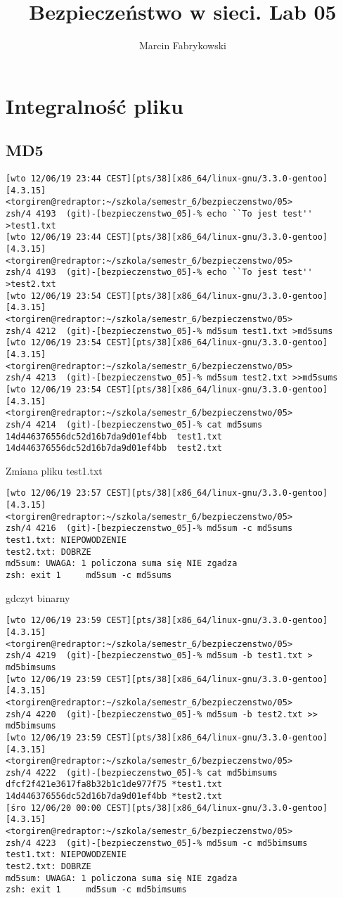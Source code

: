 \documentclass[a4paper,12pt]{article}
\author{Marcin Fabrykowski}
\title{Bezpieczeństwo w sieci. Lab 05}
\begin{document}
\maketitle
\newpage
\section{Integralność pliku}
\subsection{MD5}
\small
\begin{verbatim}
[wto 12/06/19 23:44 CEST][pts/38][x86_64/linux-gnu/3.3.0-gentoo][4.3.15]
<torgiren@redraptor:~/szkola/semestr_6/bezpieczenstwo/05>
zsh/4 4193  (git)-[bezpieczenstwo_05]-% echo ``To jest test'' >test1.txt
[wto 12/06/19 23:44 CEST][pts/38][x86_64/linux-gnu/3.3.0-gentoo][4.3.15]
<torgiren@redraptor:~/szkola/semestr_6/bezpieczenstwo/05>
zsh/4 4193  (git)-[bezpieczenstwo_05]-% echo ``To jest test'' >test2.txt
[wto 12/06/19 23:54 CEST][pts/38][x86_64/linux-gnu/3.3.0-gentoo][4.3.15]
<torgiren@redraptor:~/szkola/semestr_6/bezpieczenstwo/05>
zsh/4 4212  (git)-[bezpieczenstwo_05]-% md5sum test1.txt >md5sums         
[wto 12/06/19 23:54 CEST][pts/38][x86_64/linux-gnu/3.3.0-gentoo][4.3.15]
<torgiren@redraptor:~/szkola/semestr_6/bezpieczenstwo/05>
zsh/4 4213  (git)-[bezpieczenstwo_05]-% md5sum test2.txt >>md5sums
[wto 12/06/19 23:54 CEST][pts/38][x86_64/linux-gnu/3.3.0-gentoo][4.3.15]
<torgiren@redraptor:~/szkola/semestr_6/bezpieczenstwo/05>
zsh/4 4214  (git)-[bezpieczenstwo_05]-% cat md5sums 
14d446376556dc52d16b7da9d01ef4bb  test1.txt
14d446376556dc52d16b7da9d01ef4bb  test2.txt
\end{verbatim}
Zmiana pliku test1.txt
\small
\begin{verbatim}
[wto 12/06/19 23:57 CEST][pts/38][x86_64/linux-gnu/3.3.0-gentoo][4.3.15]
<torgiren@redraptor:~/szkola/semestr_6/bezpieczenstwo/05>
zsh/4 4216  (git)-[bezpieczenstwo_05]-% md5sum -c md5sums 
test1.txt: NIEPOWODZENIE
test2.txt: DOBRZE
md5sum: UWAGA: 1 policzona suma się NIE zgadza
zsh: exit 1     md5sum -c md5sums
\end{verbatim}
\normalsize
gdczyt binarny
\small
\begin{verbatim}
[wto 12/06/19 23:59 CEST][pts/38][x86_64/linux-gnu/3.3.0-gentoo][4.3.15]
<torgiren@redraptor:~/szkola/semestr_6/bezpieczenstwo/05>
zsh/4 4219  (git)-[bezpieczenstwo_05]-% md5sum -b test1.txt > md5bimsums
[wto 12/06/19 23:59 CEST][pts/38][x86_64/linux-gnu/3.3.0-gentoo][4.3.15]
<torgiren@redraptor:~/szkola/semestr_6/bezpieczenstwo/05>
zsh/4 4220  (git)-[bezpieczenstwo_05]-% md5sum -b test2.txt >> md5bimsums
[wto 12/06/19 23:59 CEST][pts/38][x86_64/linux-gnu/3.3.0-gentoo][4.3.15]
<torgiren@redraptor:~/szkola/semestr_6/bezpieczenstwo/05>
zsh/4 4222  (git)-[bezpieczenstwo_05]-% cat md5bimsums 
dfcf2f421e3617fa8b32b1c1de977f75 *test1.txt
14d446376556dc52d16b7da9d01ef4bb *test2.txt
[śro 12/06/20 00:00 CEST][pts/38][x86_64/linux-gnu/3.3.0-gentoo][4.3.15]
<torgiren@redraptor:~/szkola/semestr_6/bezpieczenstwo/05>
zsh/4 4223  (git)-[bezpieczenstwo_05]-% md5sum -c md5bimsums 
test1.txt: NIEPOWODZENIE
test2.txt: DOBRZE
md5sum: UWAGA: 1 policzona suma się NIE zgadza
zsh: exit 1     md5sum -c md5bimsums
\end{verbatim}
\end{document}

